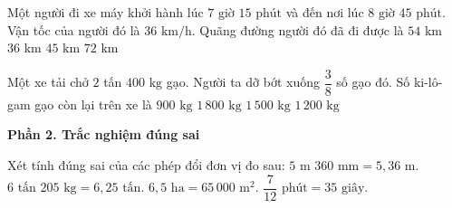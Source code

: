 \begin{ex} %
Một người đi xe máy khởi hành lúc $7\text{ giờ } 15\text{ phút}$ và đến nơi lúc $8\text{ giờ } 45\text{ phút}$. Vận tốc của người đó là $36\text{ km/h}$. Quãng đường người đó đã đi được là
\choice
{\True $54\text{ km}$}
{$36\text{ km}$}
{$45\text{ km}$}
{$72\text{ km}$}
\end{ex}

\begin{ex} %
Một xe tải chở $2$ tấn $400\text{ kg}$ gạo. Người ta dỡ bớt xuống $\dfrac{3}{8}$ số gạo đó. Số ki-lô-gam gạo còn lại trên xe là
\choice
{$900\text{ kg}$}
{$1\,800\text{ kg}$}
{\True $1\,500\text{ kg}$}
{$1\,200\text{ kg}$}
\end{ex}

\textbf{Phần 2. Trắc nghiệm đúng sai}

\begin{ex} %
Xét tính đúng sai của các phép đổi đơn vị đo sau:
\choiceTF
{\True $5\text{ m } 360\text{ mm} = 5{,}36\text{ m}$.}
{$6\text{ tấn } 205\text{ kg} = 6{,}25\text{ tấn}$.}
{\True $6{,}5\text{ ha} = 65\,000\text{ m}^2$.}
{\True $\dfrac{7}{12}\text{ phút} = 35\text{ giây}$.}
\end{ex}

